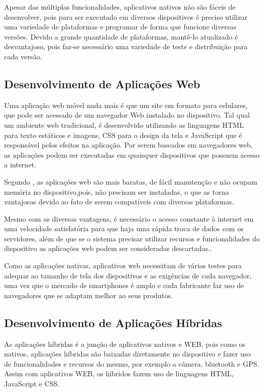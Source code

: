 		Apesar das múltiplas funcionalidades, aplicativos nativos não são fáceis de desenvolver, pois para ser executado em diversos dispositivos é preciso utilizar uma variedade de plataformas e programar de forma que funcione diversas versões. Devido a grande quantidade de plataformas, mantê-lo atualizado é desvantajoso, pois faz-se necessário uma variedade de teste e distribuição para cada versão.
	
	\subsection{Desenvolvimento de Aplicações Web}
	
		Uma aplicação web móvel nada mais é que um site em formato para celulares, que pode ser acessado de um navegador Web instalado no dispositivo. Tal qual um ambiente web tradicional, é desenvolvido utilizando as linguagens HTML para texto estáticos e imagens, CSS para o design da tela e JavaScript que é responsável pelos efeitos na aplicação. Por serem baseados em navegadores web, as aplicações podem ser executadas em quaisquer dispositivos que possuem acesso a internet.\cite{emdesafios}
		
		Segundo , as aplicações web são mais baratas, de fácil manutenção e não ocupam memória no dispositivo,pois, não precisam ser instaladas, o que as torna vantajosas devido ao fato de serem compatíveis com diversas plataformas.
		
		Mesmo com as diversas vantagens, é necessário o acesso constante à internet em uma velocidade satisfatória para que haja uma rápida troca de dados com os servidores, além de que se o sistema precisar utilizar recursos e funcionalidades do dispositivo as aplicações web podem ser consideradas descartadas.\cite{toledo2016desenvolvimento}.
		
		Como as aplicações nativas, aplicativos web necessitam de vários testes para adequar ao tamanho de tela dos dispositivos e as exigências de cada navegador, uma vez que o mercado de smartphones é amplo e cada fabricante faz uso de navegadores que se adaptam melhor ao seus produtos.
			
	\subsection{Desenvolvimento de Aplicações Híbridas}
	
		As  aplicações híbridas é a junção de aplicativos nativos e WEB, pois como os nativos, aplicações híbridas são baixadas diretamente no dispositivo e fazer uso de funcionalidades e recursos do mesmo, por exemplo a câmera, bluetooth e GPS. Assim com aplicativos WEB, os híbridos fazem uso de linguagens HTML, JavaScript e CSS. \cite{tavares2016introduccao}
		
